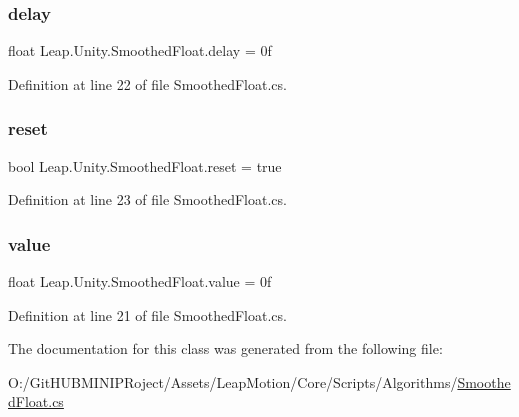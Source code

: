 \subsubsection{\texorpdfstring{delay}{delay}}
{\footnotesize\ttfamily float Leap.\+Unity.\+Smoothed\+Float.\+delay = 0f}



Definition at line 22 of file Smoothed\+Float.\+cs.

\mbox{\label{class_leap_1_1_unity_1_1_smoothed_float_a3d1208cb585d835e90d82118724082c7}} 
\subsubsection{\texorpdfstring{reset}{reset}}
{\footnotesize\ttfamily bool Leap.\+Unity.\+Smoothed\+Float.\+reset = true}



Definition at line 23 of file Smoothed\+Float.\+cs.

\mbox{\label{class_leap_1_1_unity_1_1_smoothed_float_a1fdf3ee4ae067a5ccb975320829a4327}} 
\subsubsection{\texorpdfstring{value}{value}}
{\footnotesize\ttfamily float Leap.\+Unity.\+Smoothed\+Float.\+value = 0f}



Definition at line 21 of file Smoothed\+Float.\+cs.



The documentation for this class was generated from the following file\+:\begin{DoxyCompactItemize}
\item 
O\+:/\+Git\+H\+U\+B\+M\+I\+N\+I\+P\+Roject/\+Assets/\+Leap\+Motion/\+Core/\+Scripts/\+Algorithms/\mbox{\hyperlink{_smoothed_float_8cs}{Smoothed\+Float.\+cs}}\end{DoxyCompactItemize}

